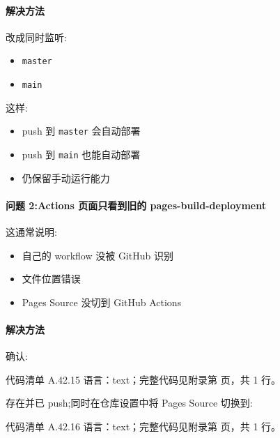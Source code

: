 \documentclass[lang=cn,scheme=chinese,color=blue,device=normal,toc=onecol,math=cm]{elegantbook}
\begin{document}
\paragraph{解决方法}


改成同时监听:\par


\begin{itemize}
\item \texttt{master}
\item \texttt{main}
\end{itemize}


这样:\par


\begin{itemize}
\item push 到 \texttt{master} 会自动部署
\item push 到 \texttt{main} 也能自动部署
\item 仍保留手动运行能力
\end{itemize}


\paragraph{问题 2:Actions 页面只看到旧的 pages-build-deployment}


这通常说明:\par


\begin{itemize}
\item 自己的 workflow 没被 GitHub 识别
\item 文件位置错误
\item Pages Source 没切到 GitHub Actions
\end{itemize}


\paragraph{解决方法}


确认:\par


\begin{codeindexbox}{代码清单 A.42.15}
语言：text；完整代码见附录第 \pageref{code:42:15} 页，共 1 行。
\end{codeindexbox}


存在并已 push;同时在仓库设置中将 Pages Source 切换到:\par


\begin{codeindexbox}{代码清单 A.42.16}
语言：text；完整代码见附录第 \pageref{code:42:16} 页，共 1 行。
\end{codeindexbox}
\end{document}
